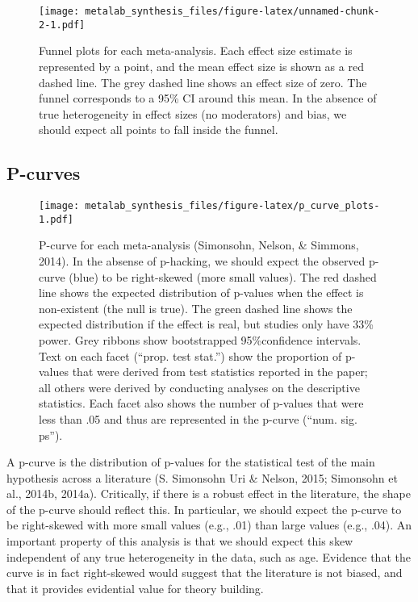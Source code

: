 \documentclass[english,floatsintext,man]{apa6}
\begin{document}
\begin{figure}[htbp]
\centering
\texttt{[image: metalab\_synthesis\_files/figure-latex/unnamed-chunk-2-1.pdf]}
\caption{Funnel plots for each meta-analysis. Each effect size estimate
is represented by a point, and the mean effect size is shown as a red
dashed line. The grey dashed line shows an effect size of zero. The
funnel corresponds to a 95\% CI around this mean. In the absence of true
heterogeneity in effect sizes (no moderators) and bias, we should expect
all points to fall inside the funnel.}
\end{figure}

\subsection{P-curves}\label{p-curves}

\begin{figure}[htbp]
\centering
\texttt{[image: metalab\_synthesis\_files/figure-latex/p\_curve\_plots-1.pdf]}
\caption{P-curve for each meta-analysis (Simonsohn, Nelson, \& Simmons,
2014). In the absense of p-hacking, we should expect the observed
p-curve (blue) to be right-skewed (more small values). The red dashed
line shows the expected distribution of p-values when the effect is
non-existent (the null is true). The green dashed line shows the
expected distribution if the effect is real, but studies only have 33\%
power. Grey ribbons show bootstrapped 95\%confidence intervals. Text on
each facet (\enquote{prop. test stat.}) show the proportion of p-values
that were derived from test statistics reported in the paper; all others
were derived by conducting analyses on the descriptive statistics. Each
facet also shows the number of p-values that were less than .05 and thus
are represented in the p-curve (\enquote{num. sig. ps}).}
\end{figure}

A p-curve is the distribution of p-values for the statistical test of
the main hypothesis across a literature (S. Simonsohn Uri \& Nelson,
2015; Simonsohn et al., 2014b, 2014a). Critically, if there is a robust
effect in the literature, the shape of the p-curve should reflect this.
In particular, we should expect the p-curve to be right-skewed with more
small values (e.g., .01) than large values (e.g., .04). An important
property of this analysis is that we should expect this skew independent
of any true heterogeneity in the data, such as age. Evidence that the
curve is in fact right-skewed would suggest that the literature is not
biased, and that it provides evidential value for theory building.
\end{document}
